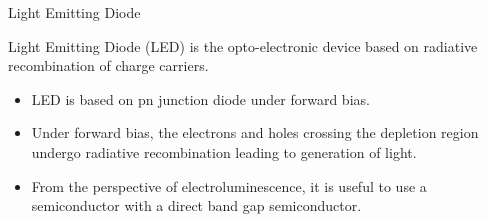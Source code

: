 %
%
\begin{frame}{Light Emitting Diode}
	\begin{definition}
		Light Emitting Diode (LED) is the opto-electronic device based on radiative recombination of charge carriers.
	\end{definition}
	\begin{itemize}
		\item LED is based on pn junction diode under forward bias.
		\item Under forward bias, the electrons and holes crossing the depletion region undergo radiative recombination leading to generation of light.
		\item From the perspective of electroluminescence, it is useful to use a semiconductor with a direct band gap semiconductor.
	\end{itemize}
\end{frame}
%

